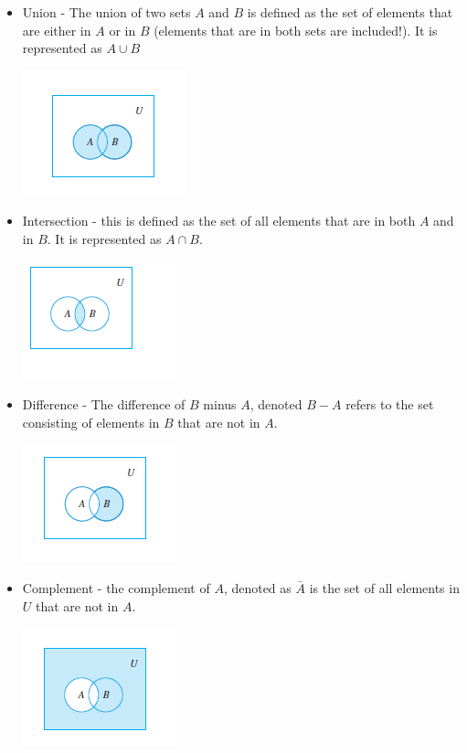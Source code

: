 \documentclass[12pt]{article}
\begin{document}
\begin{itemize}
\item  Union - The union of two sets $A$ and $B$ is defined as the set of elements that are either in $A$ or in $B$ (elements that are in both sets are included!). It is represented as $A \cup B$

\includegraphics{Union.png}

\item Intersection - this is defined as the set of all elements that are in both $A$ and in $B$. It is represented as $A \cap B$.

\includegraphics{Intersect.png}

\item Difference - The difference of $B$ minus $A$, denoted $B - A$ refers to the set consisting of elements in $B$ that are not in $A$.

\includegraphics{Difference.png}

\item Complement - the complement of $A$, denoted as $\bar{A}$ is the set of all elements in $U$ that are not in $A$.

\includegraphics{Complement.png}

\end{itemize}
\end{document}
